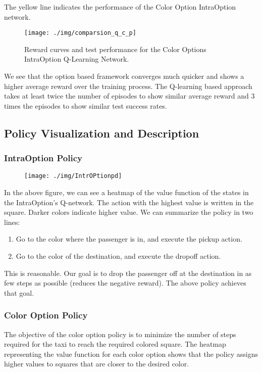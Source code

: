 \documentclass[A4]{article}
\begin{document}
    The yellow line indicates the performance of the Color Option IntraOption network.

    \begin{figure}[H]
        \centering
        \texttt{[image: ./img/comparsion\_q\_c\_p]}
        \caption{Reward curves and test performance for the Color Options IntraOption Q-Learning Network.}
        \label{fig:smdp_performance_Comparison}
    \end{figure}

    We see that the option based framework converges much quicker and shows a higher average reward over the training process.
    The Q-learning based approach takes at least twice the number of episodes to show similar average reward
    and 3 times the episodes to show similar test success rates.

    \subsection{Policy Visualization and Description}

    \subsubsection{IntraOption Policy}
    \begin{figure}[H]
        \centering
        \centering
        \texttt{[image: ./img/IntrOPtionpd]}
    \end{figure}

    In the above figure, we can see a heatmap of the value function of the states in the IntraOption's Q-network.
    The action with the highest value is written in the square.
    Darker colors indicate higher value.
    We can summarize the policy in two lines:
    \begin{enumerate}
        \item Go to the color where the passenger is in, and execute the pickup action.
        \item Go to the color of the destination, and execute the dropoff action.
    \end{enumerate}

    This is reasonable.
    Our goal is to drop the passenger off at the destination in as few steps as possible (reduces the negative reward).
    The above policy achieves that goal.

    \subsubsection{Color Option Policy}
    The objective of the color option policy is to minimize the number of steps required for the taxi to reach the required colored square. The heatmap representing the value function for each color option shows that the policy assigns higher values to squares that are closer to the desired color.
\end{document}
